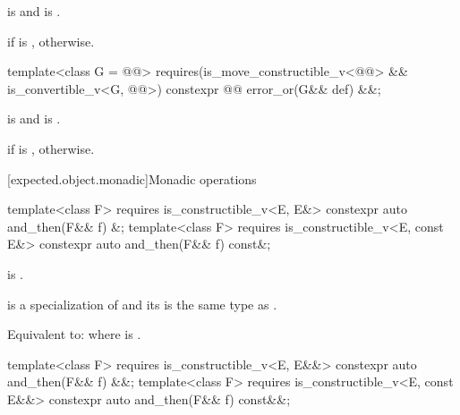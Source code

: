 \begin{itemdescr}
\pnum
\mandates
{} is  and  is .

\pnum
\returns
{} if  is ,  otherwise.
\end{itemdescr}

%
\begin{itemdecl}
template<class G = @@>
  requires(is_move_constructible_v<@@> &&
           is_convertible_v<G, @@>)
constexpr @@ error_or(G&& def) &&;
\end{itemdecl}

\begin{itemdescr}
\pnum
\mandates
{} is  and  is .

\pnum
\returns
{} if  is ,  otherwise.
\end{itemdescr}

[expected.object.monadic]{Monadic operations}

%
\begin{itemdecl}
template<class F>
  requires is_constructible_v<E, E&>
constexpr auto and_then(F&& f) &;
template<class F>
  requires is_constructible_v<E, const E&>
constexpr auto and_then(F&& f) const&;
\end{itemdecl}

\begin{itemdescr}
\pnum
\constraints
{} is .

\pnum
\mandates
{} is a specialization of  and its  is the same type as .

\pnum
\effects
Equivalent to:  where  is .
\end{itemdescr}

%
\begin{itemdecl}
template<class F>
  requires is_constructible_v<E, E&&>
constexpr auto and_then(F&& f) &&;
template<class F>
  requires is_constructible_v<E, const E&&>
constexpr auto and_then(F&& f) const&&;
\end{itemdecl}

